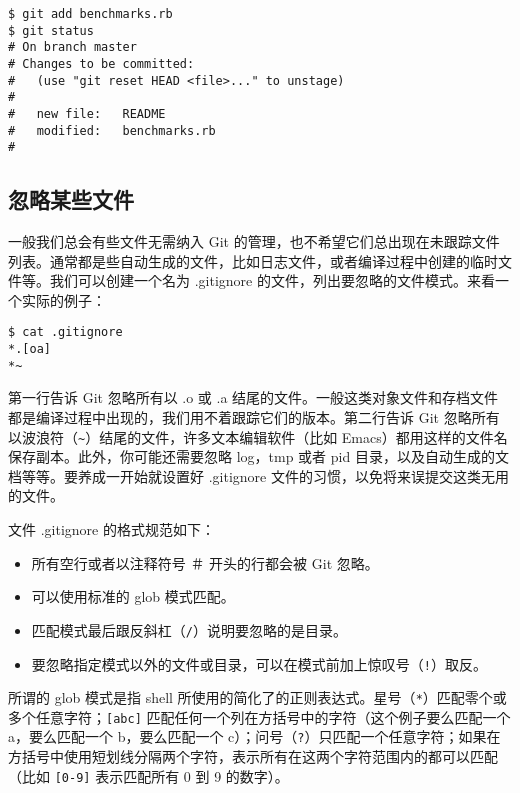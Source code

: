 \documentclass[a4paper]{book}
\begin{document}
\begin{shaded}\begin{verbatim}
$ git add benchmarks.rb
$ git status
# On branch master
# Changes to be committed:
#   (use "git reset HEAD <file>..." to unstage)
#
#	new file:   README
#	modified:   benchmarks.rb
#
\end{verbatim}\end{shaded}

\subsection{忽略某些文件}

一般我们总会有些文件无需纳入 Git 的管理，也不希望它们总出现在未跟踪文件列表。通常都是些自动生成的文件，比如日志文件，或者编译过程中创建的临时文件等。我们可以创建一个名为 .gitignore 的文件，列出要忽略的文件模式。来看一个实际的例子：

\begin{shaded}\begin{verbatim}
$ cat .gitignore
*.[oa]
*~
\end{verbatim}\end{shaded}

第一行告诉 Git 忽略所有以 .o 或 .a 结尾的文件。一般这类对象文件和存档文件都是编译过程中出现的，我们用不着跟踪它们的版本。第二行告诉 Git 忽略所有以波浪符（\texttt{\textasciitilde{}}）结尾的文件，许多文本编辑软件（比如 Emacs）都用这样的文件名保存副本。此外，你可能还需要忽略 log，tmp 或者 pid 目录，以及自动生成的文档等等。要养成一开始就设置好 .gitignore 文件的习惯，以免将来误提交这类无用的文件。

文件 .gitignore 的格式规范如下：

\begin{itemize}
\itemsep1pt\parskip0pt
\item
  所有空行或者以注释符号 ＃ 开头的行都会被 Git 忽略。
\item
  可以使用标准的 glob 模式匹配。
\item
  匹配模式最后跟反斜杠（\texttt{/}）说明要忽略的是目录。
\item
  要忽略指定模式以外的文件或目录，可以在模式前加上惊叹号（\texttt{!}）取反。
\end{itemize}

所谓的 glob 模式是指 shell 所使用的简化了的正则表达式。星号（\texttt{*}）匹配零个或多个任意字符；\texttt{{[}abc{]}} 匹配任何一个列在方括号中的字符（这个例子要么匹配一个 a，要么匹配一个 b，要么匹配一个 c）；问号（\texttt{?}）只匹配一个任意字符；如果在方括号中使用短划线分隔两个字符，表示所有在这两个字符范围内的都可以匹配（比如 \texttt{{[}0-9{]}} 表示匹配所有 0 到 9 的数字）。
\end{document}
